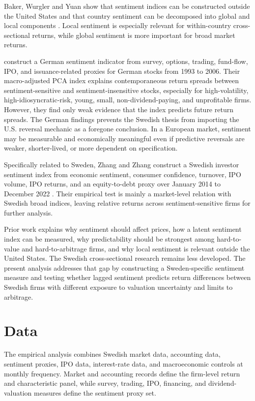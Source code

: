\documentclass[11pt]{article}
\begin{document}
Baker, Wurgler and Yuan show that sentiment indices can be constructed outside the United States and that country sentiment can be decomposed into global and local components \citep{baker2012global}. Local sentiment is especially relevant for within-country cross-sectional returns, while global sentiment is more important for broad market returns. 

\citet{finter2012german} construct a German sentiment indicator from survey, options, trading, fund-flow, IPO, and issuance-related proxies for German stocks from 1993 to 2006. Their macro-adjusted PCA index explains contemporaneous return spreads between sentiment-sensitive and sentiment-insensitive stocks, especially for high-volatility, high-idiosyncratic-risk, young, small, non-dividend-paying, and unprofitable firms. However, they find only weak evidence that the index predicts future return spreads. The German findings prevents the Swedish thesis from importing the U.S. reversal mechanic as a foregone conclusion. In a European market, sentiment may be measurable and economically meaningful even if predictive reversals are weaker, shorter-lived, or more dependent on specification.

Specifically related to Sweden, Zhang and Zhang construct a Swedish investor sentiment index from economic sentiment, consumer confidence, turnover, IPO volume, IPO returns, and an equity-to-debt proxy over January 2014 to December 2022 \citep{zhang2023sweden}. Their empirical test is mainly a market-level relation with Swedish broad indices, leaving relative returns across sentiment-sensitive firms for further analysis.

Prior work explains why sentiment should affect prices, how a latent sentiment index can be measured, why predictability should be strongest among hard-to-value and hard-to-arbitrage firms, and why local sentiment is relevant outside the United States. The Swedish cross-sectional research remains less developed. The present analysis addresses that gap by constructing a Sweden-specific sentiment measure and testing whether lagged sentiment predicts return differences between Swedish firms with different exposure to valuation uncertainty and limits to arbitrage.

\section{Data}
The empirical analysis combines Swedish market data, accounting data, sentiment proxies, IPO data, interest-rate data, and macroeconomic controls at monthly frequency. Market and accounting records define the firm-level return and characteristic panel, while survey, trading, IPO, financing, and dividend-valuation measures define the sentiment proxy set.
\end{document}

